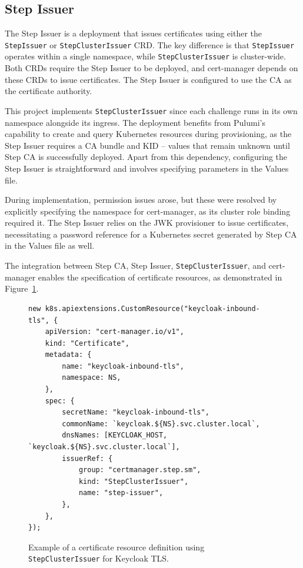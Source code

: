 \subsection{Step Issuer}
The Step Issuer is a deployment that issues certificates using either the \texttt{StepIssuer} or \texttt{StepClusterIssuer} CRD. The key difference is that \texttt{StepIssuer} operates within a single namespace, while \texttt{StepClusterIssuer} is cluster-wide. Both CRDs require the Step Issuer to be deployed, and cert-manager depends on these CRDs to issue certificates. The Step Issuer is configured to use the CA as the certificate authority.  

This project implements \texttt{StepClusterIssuer} since each challenge runs in its own namespace alongside its ingress. The deployment benefits from Pulumi's capability to create and query Kubernetes resources during provisioning, as the Step Issuer requires a CA bundle and KID -- values that remain unknown until Step CA is successfully deployed. Apart from this dependency, configuring the Step Issuer is straightforward and involves specifying parameters in the Values file.  

During implementation, permission issues arose, but these were resolved by explicitly specifying the namespace for cert-manager, as its cluster role binding required it. The Step Issuer relies on the JWK provisioner to issue certificates, necessitating a password reference for a Kubernetes secret generated by Step CA in the Values file as well.

The integration between Step CA, Step Issuer, \texttt{StepClusterIssuer}, and cert-manager enables the specification of certificate resources, as demonstrated in Figure~\ref{fig:certificate_resource}.

\begin{figure}[h]
    \centering
\begin{verbatim}
new k8s.apiextensions.CustomResource("keycloak-inbound-tls", {
    apiVersion: "cert-manager.io/v1",
    kind: "Certificate",
    metadata: {
        name: "keycloak-inbound-tls",
        namespace: NS,
    },
    spec: {
        secretName: "keycloak-inbound-tls",
        commonName: `keycloak.${NS}.svc.cluster.local`,
        dnsNames: [KEYCLOAK_HOST, `keycloak.${NS}.svc.cluster.local`],
        issuerRef: {
            group: "certmanager.step.sm",
            kind: "StepClusterIssuer",
            name: "step-issuer",
        },
    },
});  
\end{verbatim}
    \caption{Example of a certificate resource definition using \texttt{StepClusterIssuer} for Keycloak TLS.}
    \label{fig:certificate_resource}
\end{figure}

